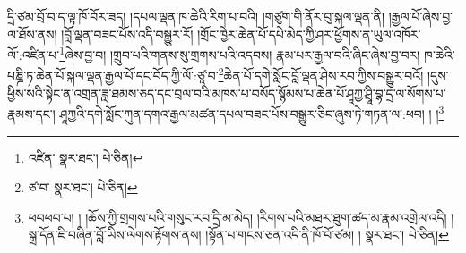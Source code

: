 དྲི་ཙམ་བྲོ་བ་ད་ལྟ་ཁོ་བོར་ཟད། །དཔལ་ལྡན་ཁ་ཆེའི་རིག་པ་བའི། །གཙུག་གི་ནོར་བུ་སྐལ་ལྡན་ནི། །རྒྱལ་པོ་ཞེས་བྱ་ལ་ཐོས་ནས། །བློ་ལྡན་བཟང་པོས་འདི་བསྒྱུར་རོ། །གྲོང་ཁྱེར་ཆེན་པོ་དཔེ་མེད་ཀྱི་ཤར་ཕྱོགས་ན་ཡུལ་འཁོར་ལོ་:འཛིན་པ་\footnote{འཛིན་  སྣར་ཐང་།  པེ་ཅིན། }ཞེས་བྱ་བ། །གྲུབ་པའི་གནས་སུ་གྲགས་པའི་འདབས། རྣམ་པར་རྒྱལ་བའི་ཞིང་ཞེས་བྱ་བར། ཁ་ཆེའི་པཎྜི་ཏ་ཆེན་པོ་སྐལ་ལྡན་རྒྱལ་པོ་དང་བོད་ཀྱི་ལོ་:ཙཱ་བ་\footnote{ཙ་བ་  སྣར་ཐང་།  པེ་ཅིན། }ཆེན་པོ་དགེ་སློང་བློ་ལྡན་ཤེས་རབ་ཀྱིས་བསྒྱུར་བའོ། །དུས་ཕྱིས་སའི་སྟེང་ན་འགྲན་ཟླ་ཐམས་ཅད་དང་བྲལ་བའི་མཁས་པ་བསོད་སྙོམས་པ་ཆེན་པོ་ཤཱཀྱ་ཤྲཱི་བྷ་དྲ་ལ་སོགས་པ་རྣམས་དང་། ཤཱཀྱའི་དགེ་སློང་ཀུན་དགའ་རྒྱལ་མཚན་དཔལ་བཟང་པོས་བསྒྱུར་ཅིང་ཞུས་ཏེ་གཏན་ལ་:ཕབ། ། །\footnote{ཕབཕབ་པ། ། །ཆོས་ཀྱི་གྲགས་པའི་གསུང་རབ་དྲི་མ་མེད། །རིགས་པའི་མཐར་ཐུག་ཚད་མ་རྣམ་འགྲེལ་འདི། །སྒྲ་དོན་ཇི་བཞིན་བློ་ཡིས་ལེགས་རྟོགས་ནས། །སྟོན་པ་གངས་ཅན་འདི་ནི་ཁོ་བོ་ཙམ། །  སྣར་ཐང་།  པེ་ཅིན། }